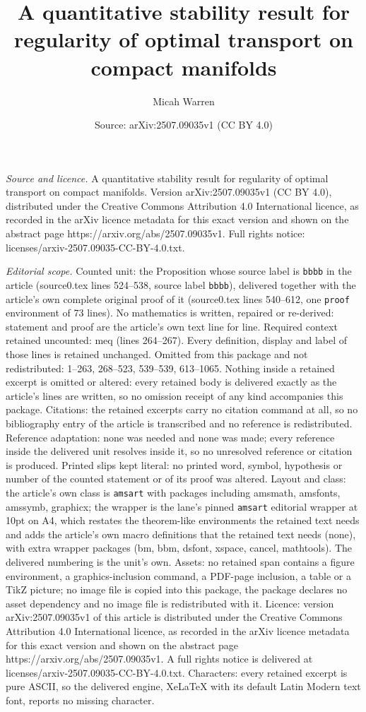 \documentclass[10pt,a4paper]{amsart}
\title[A quantitative stability result for regularity of optimal tr]{A quantitative stability result for regularity of optimal transport on compact manifolds}
\author{Micah Warren}
\date{Source: arXiv:2507.09035v1 (CC BY 4.0)}
\begin{document}
\maketitle

\noindent\emph{Source and licence.} A quantitative stability result for regularity of optimal transport on compact manifolds. Version arXiv:2507.09035v1 (CC BY 4.0), distributed under the Creative Commons Attribution 4.0 International licence, as recorded in the arXiv licence metadata for this exact version and shown on the abstract page https://arxiv.org/abs/2507.09035v1. Full rights notice: licenses/arxiv-2507.09035-CC-BY-4.0.txt.\par\smallskip

\noindent\textit{Editorial scope.} Counted unit: the Proposition whose source label is \texttt{bbbb} in the article (source0.tex lines 524--538, source label \texttt{bbbb}), delivered together with the article's own complete original proof of it (source0.tex lines 540--612, one \texttt{proof} environment of 73 lines). No mathematics is written, repaired or re-derived: statement and proof are the article's own text line for line. Required context retained uncounted: meq (lines 264--267). Every definition, display and label of those lines is retained unchanged. Omitted from this package and not redistributed: 1--263, 268--523, 539--539, 613--1065. Nothing inside a retained excerpt is omitted or altered: every retained body is delivered exactly as the article's lines are written, so no omission receipt of any kind accompanies this package. Citations: the retained excerpts carry no citation command at all, so no bibliography entry of the article is transcribed and no reference is redistributed. Reference adaptation: none was needed and none was made; every reference inside the delivered unit resolves inside it, so no unresolved reference or citation is produced. Printed slips kept literal: no printed word, symbol, hypothesis or number of the counted statement or of its proof was altered. Layout and class: the article's own class is \texttt{amsart} with packages including amsmath, amsfonts, amssymb, graphicx; the wrapper is the lane's pinned \texttt{amsart} editorial wrapper at 10pt on A4, which restates the theorem-like environments the retained text needs and adds the article's own macro definitions that the retained text needs (none), with extra wrapper packages (bm, bbm, dsfont, xspace, cancel, mathtools). The delivered numbering is the unit's own. Assets: no retained span contains a figure environment, a graphics-inclusion command, a PDF-page inclusion, a table or a TikZ picture; no image file is copied into this package, the package declares no asset dependency and no image file is redistributed with it. Licence: version arXiv:2507.09035v1 of this article is distributed under the Creative Commons Attribution 4.0 International licence, as recorded in the arXiv licence metadata for this exact version and shown on the abstract page https://arxiv.org/abs/2507.09035v1. A full rights notice is delivered at licenses/arxiv-2507.09035-CC-BY-4.0.txt. Characters: every retained excerpt is pure ASCII, so the delivered engine, XeLaTeX with its default Latin Modern text font, reports no missing character.
\end{document}
